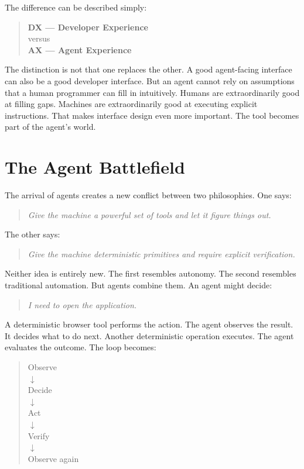\documentclass[11pt,twoside]{book}
\begin{document}
The difference can be described simply:
\begin{quote}
\textbf{DX --- Developer Experience}\\
versus\\
\textbf{AX --- Agent Experience}
\end{quote}
The distinction is not that one replaces the other.
A good agent-facing interface can also be a good developer interface.
But an agent cannot rely on assumptions that a human programmer can fill in intuitively.
Humans are extraordinarily good at filling gaps.
Machines are extraordinarily good at executing explicit instructions.
That makes interface design even more important.
The tool becomes part of the agent's world.

\section*{The Agent Battlefield}

The arrival of agents creates a new conflict between two philosophies.
One says:
\begin{quote}
\emph{Give the machine a powerful set of tools and let it figure things out.}
\end{quote}
The other says:
\begin{quote}
\emph{Give the machine deterministic primitives and require explicit verification.}
\end{quote}

Neither idea is entirely new.
The first resembles autonomy.
The second resembles traditional automation.
But agents combine them.
An agent might decide:
\begin{quote}
\emph{I need to open the application.}
\end{quote}
A deterministic browser tool performs the action.
The agent observes the result.
It decides what to do next.
Another deterministic operation executes.
The agent evaluates the outcome.
The loop becomes:
\begin{quote}
\centering
Observe\\
$\downarrow$\\
Decide\\
$\downarrow$\\
Act\\
$\downarrow$\\
Verify\\
$\downarrow$\\
Observe again
\end{quote}
\end{document}
